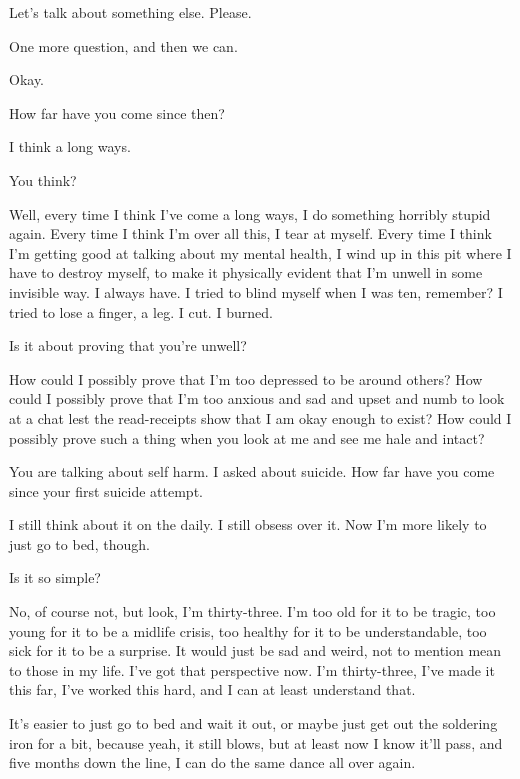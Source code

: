 \begin{paracol}{2}
\begin{leftcolumn}
\noindent Let's talk about something else. Please.

\begin{ally}
One more question, and then we can.
\end{ally}
Okay.

\begin{ally}
How far have you come since then?
\end{ally}
I think a long ways.

\begin{ally}
You think?
\end{ally}
Well, every time I think I've come a long ways, I do something horribly stupid again. Every time I think I'm over all this, I tear at myself. Every time I think I'm getting good at talking about my mental health, I wind up in this pit where I have to destroy myself, to make it physically evident that I'm unwell in some invisible way. I always have. I tried to blind myself when I was ten, remember? I tried to lose a finger, a leg. I cut. I burned.

\begin{ally}
Is it about proving that you're unwell?
\end{ally}
How could I possibly prove that I'm too depressed to be around others? How could I possibly prove that I'm too anxious and sad and upset and numb to look at a chat lest the read-receipts show that I am okay enough to exist? How could I possibly prove such a thing when you look at me and see me hale and intact?

\begin{ally}
You are talking about self harm. I asked about suicide. How far have you come since your first suicide attempt.
\end{ally}
I still think about it on the daily. I still obsess over it. Now I'm more likely to just go to bed, though.

\begin{ally}
Is it so simple?
\end{ally}
No, of course not, but look, I'm thirty-three. I'm too old for it to be tragic, too young for it to be a midlife crisis, too healthy for it to be understandable, too sick for it to be a surprise. It would just be sad and weird, not to mention mean to those in my life. I've got that perspective now. I'm thirty-three, I've made it this far, I've worked this hard, and I can at least understand that.

It's easier to just go to bed and wait it out, or maybe just get out the soldering iron for a bit, because yeah, it still blows, but at least now I know it'll pass, and five months down the line, I can do the same dance all over again.


\end{leftcolumn}
\end{paracol}
